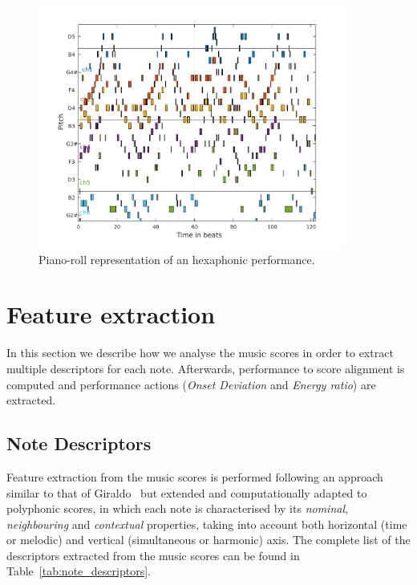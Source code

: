 \begin{figure}[ht!]
\centering
\includegraphics[width=0.9\textwidth]{Figures/pianoroll.pdf}
\caption{Piano-roll representation of an hexaphonic performance.}
\label{fig:pianoroll}
\end{figure}

\section{Feature extraction}
In this section we describe how we analyse the music scores in order to extract multiple descriptors for each note. Afterwards, performance to score alignment is computed and performance actions (\textit{Onset Deviation} and \textit{Energy ratio}) are extracted.

\subsection{Note Descriptors}
\label{sec:notedescriptors}
Feature extraction from the music scores is performed following an approach similar to that of Giraldo~\cite{Giraldo2016} but extended and computationally adapted to polyphonic scores, in which each note is characterised by its \textit{nominal}, \textit{neighbouring} and \textit{contextual} properties, taking into account both horizontal (time or melodic) and vertical (simultaneous or harmonic) axis. The complete list of the descriptors extracted from the music scores can be found in Table~\ref{tab:note_descriptors}.



